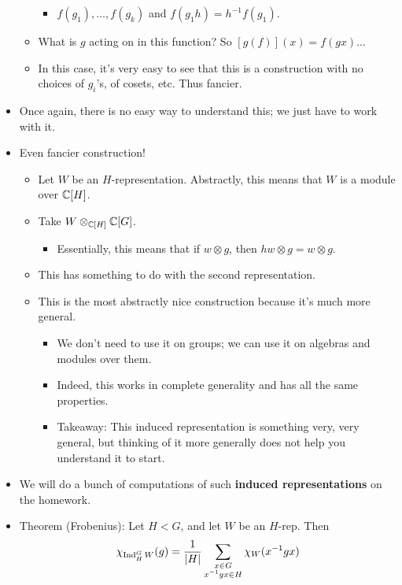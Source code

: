 \documentclass[../notes.tex]{subfiles}
\begin{document}
\begin{itemize}
\begin{itemize}
        \begin{itemize}
            \item $f(g_1),\dots,f(g_k)$ and $f(g_1h)=h^{-1}f(g_1)$.
        \end{itemize}
        \item What is $g$ acting on in this function? So $[g(f)](x)=f(gx)$...
        \item In this case, it's very easy to see that this is a construction with no choices of $g_i$'s, of cosets, etc. Thus fancier.
    \end{itemize}
    \item Once again, there is no easy way to understand this; we just have to work with it.
    \item Even fancier construction!
    \begin{itemize}
        \item Let $W$ be an $H$-representation. Abstractly, this means that $W$ is a module over $\mathbb{C}[H]$.
        \item Take $W\otimes_{\mathbb{C}[H]}\mathbb{C}[G]$.
        \begin{itemize}
            \item Essentially, this means that if $w\otimes g$, then $hw\otimes g=w\otimes g$.
        \end{itemize}
        \item This has something to do with the second representation.
        \item This is the most abstractly nice construction because it's much more general.
        \begin{itemize}
            \item We don't need to use it on groups; we can use it on algebras and modules over them.
            \item Indeed, this works in complete generality and has all the same properties.
            \item Takeaway: This induced representation is something very, very general, but thinking of it more generally does not help you understand it to start.
        \end{itemize}
    \end{itemize}
    \item We will do a bunch of computations of such \textbf{induced representations} on the homework.
    \item Theorem (Frobenius): Let $H<G$, and let $W$ be an $H$-rep. Then
    \begin{equation*}
        \chi_{\ind_H^GW}(g) = \frac{1}{|H|}\sum_{\substack{x\in G\\x^{-1}gx\in H}}\chi_W(x^{-1}gx)

\end{equation*}
\end{itemize}
\end{document}
